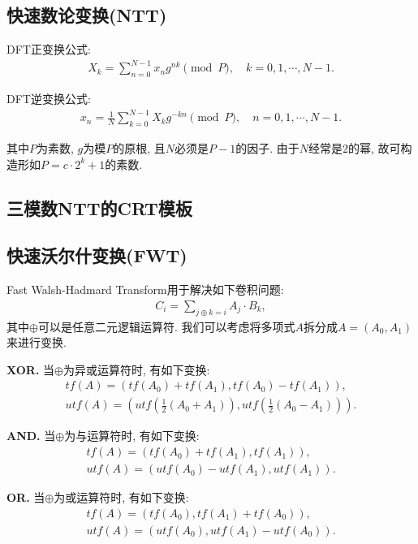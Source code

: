 

\subsection{快速数论变换(NTT)}
DFT正变换公式:
\begin{gather*}
    X_k = \sum_{n=0}^{N-1} x_n g^{nk} \pmod{P}, \quad k = 0,1,\cdots,N-1.
\end{gather*}

DFT逆变换公式:
\begin{gather*}
    x_n = \frac{1}{N} \sum_{k=0}^{N-1} X_k g^{-kn} \pmod{P}, \quad n = 0,1,\cdots,N-1.
\end{gather*}

其中$P$为素数, $g$为模$P$的原根, 且$N$必须是$P−1$的因子.
由于$N$经常是$2$的幂, 故可构造形如$P = c \cdot 2^k + 1$的素数.



\subsection{三模数NTT的CRT模板}


\subsection{快速沃尔什变换(FWT)}
Fast Walsh-Hadmard Transform用于解决如下卷积问题:
\begin{gather*}
    C_i = \sum_{j \oplus k = i} A_j \cdot B_k,
\end{gather*}
其中$\oplus$可以是任意二元逻辑运算符.
我们可以考虑将多项式$A$拆分成$A=(A_0,A_1)$来进行变换.

\textbf{XOR.}
当$\oplus$为异或运算符时, 有如下变换:
\begin{gather*}
    tf(A) = (tf(A_0)+tf(A_1), tf(A_0)-tf(A_1)), \\
    utf(A) = (utf(\frac{1}{2}(A_0+A_1)), utf(\frac{1}{2}(A_0-A_1))).
\end{gather*}

\textbf{AND.}
当$\oplus$为与运算符时, 有如下变换:
\begin{gather*}
    tf(A) = (tf(A_0)+tf(A_1), tf(A_1)), \\
    utf(A) = (utf(A_0)-utf(A_1), utf(A_1)).
\end{gather*}

\textbf{OR.}
当$\oplus$为或运算符时, 有如下变换:
\begin{gather*}
    tf(A) = (tf(A_0), tf(A_1)+tf(A_0)), \\
    utf(A) = (utf(A_0), utf(A_1)-utf(A_0)).
\end{gather*}

